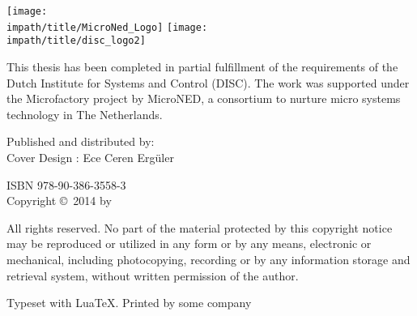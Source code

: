 \vspace{20mm}
\begin{center}
    \Large\ilhana
\end{center}
\newpage
\thispagestyle{empty}
\smallskip\noindent
{
\flushleft\texttt{[image: \\impath/title/MicroNed\_Logo]}\hspace*{0.75cm}
\vspace{1em}
\texttt{[image: \\impath/title/disc\_logo2]}
\vspace{1em}


\parbox{\textwidth}{\noindent This thesis has been completed in partial fulfillment of
the requirements of the Dutch Institute for Systems and Control
(DISC). The work was supported under the Microfactory project by
MicroNED, a consortium to nurture micro systems technology in
The Netherlands.
}
\vfill

Published and distributed by: \ilhana\\
Cover Design : Ece Ceren Erg\"{u}ler

\bigskip{}
ISBN 978-90-386-3558-3\\
Copyright \copyright~2014 by \ilhana
}


\bigskip{}
\noindent All rights reserved. No part of the material protected by
this copyright notice may be reproduced or utilized in any form or
by any means, electronic or mechanical, including photocopying,
recording or by any information storage and retrieval system,
without written permission of the author.

\bigskip{}
\noindent Typeset with Lua\kern-0.9bp\TeX. Printed by some company

